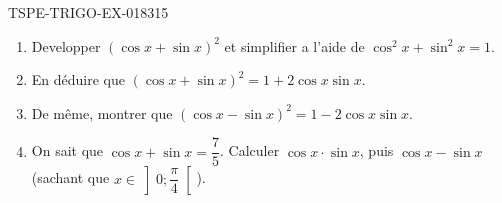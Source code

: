 \begin{exercice}{TSPE-TRIGO-EX-018}{3}{15}
\begin{enumerate}
  \item Developper $(\cos x + \sin x)^2$ et simplifier a l'aide de $\cos^2 x + \sin^2 x = 1$.
  \item En déduire que $(\cos x + \sin x)^2 = 1 + 2\cos x \sin x$.
  \item De même, montrer que $(\cos x - \sin x)^2 = 1 - 2\cos x \sin x$.
  \item On sait que $\cos x + \sin x = \dfrac{7}{5}$. Calculer $\cos x \cdot \sin x$, puis $\cos x - \sin x$ (sachant que $x \in \left]0;\dfrac{\pi}{4}\right[$).
\end{enumerate}
\end{exercice}
